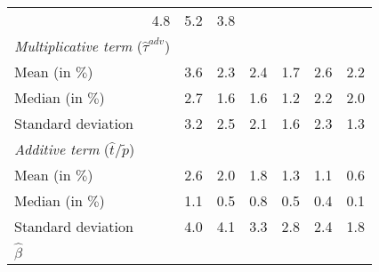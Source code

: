 \begin{tabular}{lllllll}
  \multicolumn{1}{r}{4.8} &
  \multicolumn{1}{r}{5.2} &
  \multicolumn{1}{r}{3.8} \\
\multicolumn{1}{l}{{\textit{Multiplicative term} ($\widehat{\tau}^{adv}$)}} &
  \multicolumn{1}{|r}{} &
  \multicolumn{1}{r}{} &
  \multicolumn{1}{r}{} &
  \multicolumn{1}{r}{} &
  \multicolumn{1}{r}{} &
  \multicolumn{1}{r}{} \\
\multicolumn{1}{l}{\hspace{1em}Mean (in $\%$)} &
  \multicolumn{1}{|r}{3.6} &
  \multicolumn{1}{r}{2.3} &
  \multicolumn{1}{r}{2.4} &
  \multicolumn{1}{r}{1.7} &
  \multicolumn{1}{r}{2.6} &
  \multicolumn{1}{r}{2.2} \\
\multicolumn{1}{l}{\hspace{1em}Median (in $\%$)} &
  \multicolumn{1}{|r}{2.7} &
  \multicolumn{1}{r}{1.6} &
  \multicolumn{1}{r}{1.6} &
  \multicolumn{1}{r}{1.2} &
  \multicolumn{1}{r}{2.2} &
  \multicolumn{1}{r}{2.0} \\
\multicolumn{1}{l}{\hspace{1em}Standard deviation} &
  \multicolumn{1}{|r}{3.2} &
  \multicolumn{1}{r}{2.5} &
  \multicolumn{1}{r}{2.1} &
  \multicolumn{1}{r}{1.6} &
  \multicolumn{1}{r}{2.3} &
  \multicolumn{1}{r}{1.3} \\
\multicolumn{1}{l}{{\textit{Additive term} ($\widehat{t}/\widetilde{p}$)}} &
  \multicolumn{1}{|r}{} &
  \multicolumn{1}{r}{} &
  \multicolumn{1}{r}{} &
  \multicolumn{1}{r}{} &
  \multicolumn{1}{r}{} &
  \multicolumn{1}{r}{} \\
\multicolumn{1}{l}{\hspace{1em}Mean (in $\%$)} &
  \multicolumn{1}{|r}{2.6} &
  \multicolumn{1}{r}{2.0} &
  \multicolumn{1}{r}{1.8} &
  \multicolumn{1}{r}{1.3} &
  \multicolumn{1}{r}{1.1} &
  \multicolumn{1}{r}{0.6} \\
\multicolumn{1}{l}{\hspace{1em}Median (in $\%$)} &
  \multicolumn{1}{|r}{1.1} &
  \multicolumn{1}{r}{0.5} &
  \multicolumn{1}{r}{0.8} &
  \multicolumn{1}{r}{0.5} &
  \multicolumn{1}{r}{0.4} &
  \multicolumn{1}{r}{0.1} \\
\multicolumn{1}{l}{\hspace{1em}Standard deviation} &
  \multicolumn{1}{|r}{4.0} &
  \multicolumn{1}{r}{4.1} &
  \multicolumn{1}{r}{3.3} &
  \multicolumn{1}{r}{2.8} &
  \multicolumn{1}{r}{2.4} &
  \multicolumn{1}{r}{1.8} \\
\multicolumn{1}{l}{{$\widehat{\beta}$}} &
  \multicolumn{1}{|r}{} &
  \multicolumn{1}{r}{} &
  \multicolumn{1}{r}{} &
  \multicolumn{1}{r}{} &

\end{tabular}

